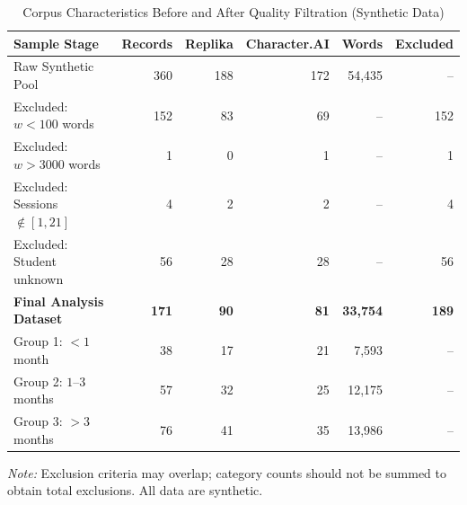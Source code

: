 


\begin{table}[htbp]
\centering
\small

\caption{Corpus Characteristics Before and After
Quality Filtration (Synthetic Data)}

\label{tab:corpus_descriptives}

\begin{tabular}{lrrrrr}
\toprule

\textbf{Sample Stage} &
\textbf{Records} &
\textbf{Replika} &
\textbf{Character.AI} &
\textbf{Words} &
\textbf{Excluded} \\

\midrule

Raw Synthetic Pool & 360 & 188 & 172 & 54,435 & -- \\

\quad Excluded: $w < 100$ words
& 152 & 83 & 69 & -- & 152 \\

\quad Excluded: $w > 3000$ words
& 1 & 0 & 1 & -- & 1 \\

\quad Excluded: Sessions $\notin [1,21]$
& 4 & 2 & 2 & -- & 4 \\

\quad Excluded: Student unknown
& 56 & 28 & 28 & -- & 56 \\

\midrule

\textbf{Final Analysis Dataset}
& \textbf{171} & \textbf{90}
& \textbf{81} & \textbf{33,754}
& \textbf{189} \\

\quad Group 1: $<1$ month
& 38 & 17 & 21 & 7,593 & -- \\

\quad Group 2: $1$--$3$ months
& 57 & 32 & 25 & 12,175 & -- \\

\quad Group 3: $>3$ months
& 76 & 41 & 35 & 13,986 & -- \\

\bottomrule
\end{tabular}

\par\smallskip
{\footnotesize\emph{Note:}
Exclusion criteria may overlap; category counts
should not be summed to obtain total exclusions.
All data are synthetic.}

\end{table}



